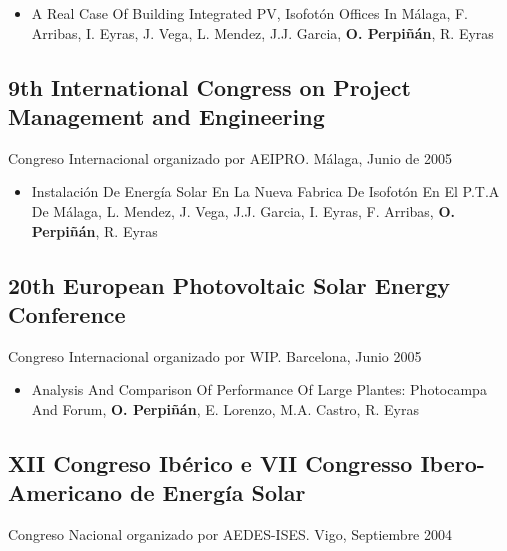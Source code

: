 \documentclass[article, a4paper]{memoir}
\begin{document}
\begin{itemize}
\item A Real Case Of Building Integrated PV, Isofotón Offices In Málaga, F. Arribas, I. Eyras, J. Vega, L. Mendez, J.J. Garcia, \textbf{O. Perpiñán}, R. Eyras
\end{itemize}

\subsection{9th International Congress on  Project Management and Engineering}
\label{sec:orgheadline60}
Congreso Internacional organizado por AEIPRO. Málaga, Junio de 2005

\begin{itemize}
\item Instalación De Energía Solar En La Nueva Fabrica De Isofotón En El P.T.A De Málaga, L. Mendez, J. Vega, J.J. Garcia, I. Eyras, F. Arribas, \textbf{O. Perpiñán}, R. Eyras
\end{itemize}

\subsection{20th European Photovoltaic Solar Energy Conference}
\label{sec:orgheadline61}
Congreso Internacional organizado por WIP. Barcelona, Junio 2005

\begin{itemize}
\item Analysis And Comparison Of Performance Of Large Plantes: Photocampa And Forum, \textbf{O. Perpiñán}, E. Lorenzo, M.A. Castro, R. Eyras
\end{itemize}

\subsection{XII Congreso Ibérico e VII Congresso Ibero-Americano de Energía Solar}
\label{sec:orgheadline62}
Congreso Nacional organizado por AEDES-ISES. Vigo, Septiembre 2004
\end{document}
